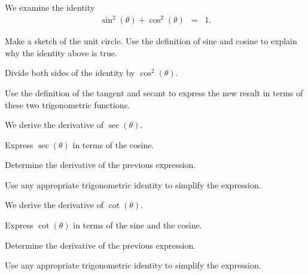 \begin{problem}

\item We examine the identity
  \begin{eqnarray*}
    \sin^2(\theta) + \cos^2(\theta) & = & 1.
  \end{eqnarray*}

  \begin{subproblem}
  \item Make a sketch of the unit circle. Use the definition of sine
    and cosine to explain why the identity above is true.
    \vfill

  \item Divide both sides of the identity by $\cos^2(\theta)$.
    \vfill

  \item Use the definition of the tangent and secant to express the
    new result in terms of these two trigonometric functions.
    \vfill

  \end{subproblem}

  \clearpage

\item We derive the derivative of $\sec(\theta)$.

  \begin{subproblem}
    \item Express $\sec(\theta)$ in terms of the cosine.
      \vspace{4em}
    \item Determine the derivative of the previous expression.
      \vfill
    \item Use any appropriate trigonometric identity to simplify the
      expression.
      \vfill
  \end{subproblem}
  \clearpage

\item We derive the derivative of $\cot(\theta)$.

  \begin{subproblem}
    \item Express $\cot(\theta)$ in terms of the sine and the cosine.
      \vspace{4em}
    \item Determine the derivative of the previous expression.
      \vfill
    \item Use any appropriate trigonometric identity to simplify the
      expression.
      \vfill
  \end{subproblem}
  \clearpage

\end{problem}

